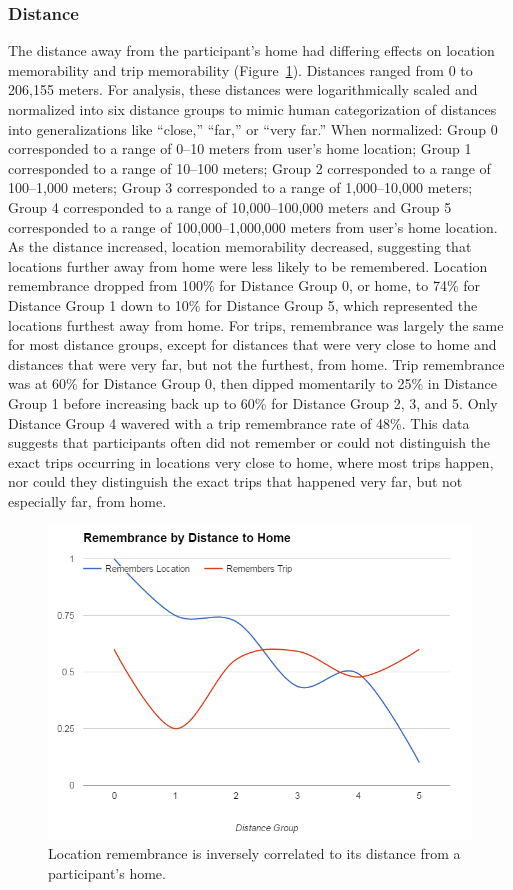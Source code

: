 \documentclass{sigchi}
\begin{document}
\subsubsection{Distance}
The distance away from the participant’s home had differing effects on location memorability and trip memorability (Figure~\ref{fig:distancememory}). Distances ranged from 0 to 206,155 meters. For analysis, these distances were logarithmically scaled and normalized into six distance groups to mimic human categorization of distances into generalizations like ``close,'' ``far,'' or ``very far.'' When normalized: Group 0 corresponded to a range of 0--10 meters from user's home location; Group 1 corresponded to a range of 10--100 meters; Group 2 corresponded to a range of 100--1,000 meters; Group 3 corresponded to a range of 1,000--10,000 meters; Group 4 corresponded to a range of 10,000--100,000 meters and Group 5 corresponded to a range of 100,000--1,000,000 meters from user's home location. As the distance increased, location memorability decreased, suggesting that locations further away from home were less likely to be remembered. Location remembrance dropped from 100\% for Distance Group 0, or home, to 74\% for Distance Group 1 down to 10\% for Distance Group 5, which represented the locations furthest away from home. For trips, remembrance was largely the same for most distance groups, except for distances that were very close to home and distances that were very far, but not the furthest, from home. Trip remembrance was at 60\% for Distance Group 0, then dipped momentarily to 25\% in Distance Group 1 before increasing back up to 60\% for Distance Group 2, 3, and 5. Only Distance Group 4 wavered with a trip remembrance rate of 48\%. This data suggests that participants often did not remember or could not distinguish the exact trips occurring in locations very close to home, where most trips happen, nor could they distinguish the exact trips that happened very far, but not especially far, from home.  

\begin{figure}
   \centering
     \includegraphics[width=1\linewidth]{distance}
     \caption{Location remembrance is inversely correlated to its distance from a participant's home.}
     \label{fig:distancememory}
\end{figure}
\end{document}
